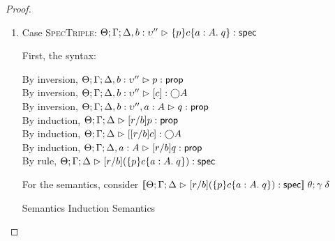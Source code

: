 \begin{proof}
\begin{enumerate}
\item Case \textsc{SpecTriple}: $\judgeS[\Theta; \Gamma; \Delta, b:\upsilon'']{\spec{p}{c}{a:A}{q}}$
  
  First, the syntax:
  \begin{tabbedproof}
    \oo By inversion, $\judgeA[\Theta; \Gamma; \Delta, b:\upsilon'']{p}{\assert}$ \\
    \oo By inversion, $\judgeA[\Theta; \Gamma; \Delta, b:\upsilon'']{\comp{c}}{\monad{A}}$ \\
    \oo By inversion, $\judgeA[\Theta; \Gamma; \Delta, b:\upsilon'', a:A]{q}{\assert}$ \\
    \oo By induction, $\judgeA[\Theta; \Gamma; \Delta]{[r/b]p}{\assert}$ \\
    \oo By induction, $\judgeA[\Theta; \Gamma; \Delta]{\comp{[r/b]c}}{\monad{A}}$ \\
    \oo By induction, $\judgeA[\Theta; \Gamma; \Delta, a:A]{[r/b]q}{\assert}$ \\
    \oo By rule, $\judgeS[\Theta; \Gamma; \Delta]{[r/b](\spec{p}{c}{a:A}{q})}$
  \end{tabbedproof}

  For the semantics, consider $\interp{\judgeS[\Theta; \Gamma; \Delta]{[r/b](\spec{p}{c}{a:A}{q})}}\;\theta;\gamma\;\delta$
  \begin{eqnproof}
          {Semantics}
          {Induction}
          {Semantics}
  \end{eqnproof}


\end{enumerate}
\end{proof}
